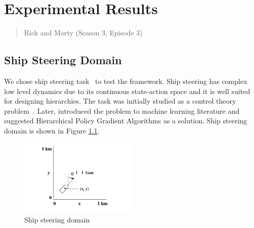 \chapter{Experimental Results}
\label{experimental}
\thispagestyle{empty}

\begin{quotation}
{\footnotesize
{}
\begin{flushright}
Rick and Morty (Season 3, Episode 3)
\end{flushright}
}
\end{quotation}

 


\section{Ship Steering Domain}
We chose ship steering task~\cite{Anderson:1990:CSC:104204.104226} to test the framework. Ship steering has complex low level dynamics due to its continuous state-action space and it is well suited for designing hierarchies. The task was initially studied as a control theory problem~\cite{shipsteeringACD}. Later, \cite{GhavamzadehHierarchicalPG} introduced the problem to machine learning literature and suggested Hierarchical Policy Gradient Algorithms as a solution. 
Ship steering domain is shown in Figure \ref{fig:shipsteeringdomainbig}.

\begin{figure}[t]
      \centering
      \includegraphics[width = 0.5\textwidth]{./pictures/shipbigenv.png}
      \caption{Ship steering domain}
      \label{fig:shipsteeringdomainbig}
\end{figure}
    
